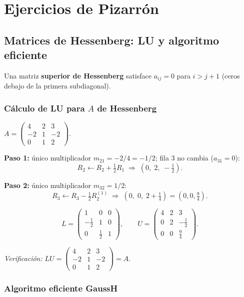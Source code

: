 \documentclass[11pt,a4paper]{article}
\begin{document}
\section{Ejercicios de Pizarrón}
\label{sec:pizarron}

\subsection{Matrices de Hessenberg: LU y algoritmo eficiente}
\label{sec:hessenberg_lu}

Una matriz \textbf{superior de Hessenberg} satisface $a_{ij}=0$ para $i > j+1$
(ceros debajo de la primera subdiagonal).

\subsubsection{Cálculo de LU para $A$ de Hessenberg}

$A = \begin{pmatrix}4&2&3\\-2&1&-2\\0&1&2\end{pmatrix}$.

\textbf{Paso 1:} único multiplicador $m_{21}=-2/4=-1/2$; fila 3 no cambia ($a_{31}=0$):
\[
  R_2 \leftarrow R_2 + \tfrac{1}{2}R_1
  \;\Rightarrow\; (0,\;2,\;-\tfrac{1}{2}).
\]

\textbf{Paso 2:} único multiplicador $m_{32}=1/2$:
\[
  R_3 \leftarrow R_3 - \tfrac{1}{2}R_2^{(1)}
  \;\Rightarrow\; (0,\;0,\;2+\tfrac{1}{4}) = (0,0,\tfrac{9}{4}).
\]

\[
  L = \begin{pmatrix}1&0&0\\-\frac{1}{2}&1&0\\0&\frac{1}{2}&1\end{pmatrix}, \qquad
  U = \begin{pmatrix}4&2&3\\0&2&-\frac{1}{2}\\0&0&\frac{9}{4}\end{pmatrix}.
\]

\textit{Verificación:}
$LU = \begin{pmatrix}4&2&3\\-2&1&-2\\0&1&2\end{pmatrix} = A$. \checkmark

\subsubsection{Algoritmo eficiente GaussH}
\label{sec:hessenberg_alg}
\end{document}
